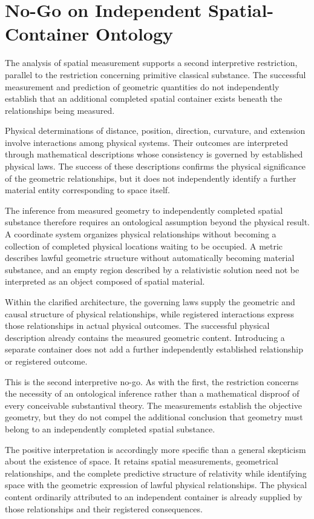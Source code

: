 \documentclass[12pt,onecolumn]{article}
\begin{document}
\section{No-Go on Independent Spatial-Container Ontology}

The analysis of spatial measurement supports a second interpretive restriction, parallel to the restriction concerning primitive classical substance. The successful measurement and prediction of geometric quantities do not independently establish that an additional completed spatial container exists beneath the relationships being measured.

Physical determinations of distance, position, direction, curvature, and extension involve interactions among physical systems. Their outcomes are interpreted through mathematical descriptions whose consistency is governed by established physical laws. The success of these descriptions confirms the physical significance of the geometric relationships, but it does not independently identify a further material entity corresponding to space itself.

The inference from measured geometry to independently completed spatial substance therefore requires an ontological assumption beyond the physical result. A coordinate system organizes physical relationships without becoming a collection of completed physical locations waiting to be occupied. A metric describes lawful geometric structure without automatically becoming material substance, and an empty region described by a relativistic solution need not be interpreted as an object composed of spatial material.

Within the clarified architecture, the governing laws supply the geometric and causal structure of physical relationships, while registered interactions express those relationships in actual physical outcomes. The successful physical description already contains the measured geometric content. Introducing a separate container does not add a further independently established relationship or registered outcome.

This is the second interpretive no-go. As with the first, the restriction concerns the necessity of an ontological inference rather than a mathematical disproof of every conceivable substantival theory. The measurements establish the objective geometry, but they do not compel the additional conclusion that geometry must belong to an independently completed spatial substance.

The positive interpretation is accordingly more specific than a general skepticism about the existence of space. It retains spatial measurements, geometrical relationships, and the complete predictive structure of relativity while identifying space with the geometric expression of lawful physical relationships. The physical content ordinarily attributed to an independent container is already supplied by those relationships and their registered consequences.
\end{document}
